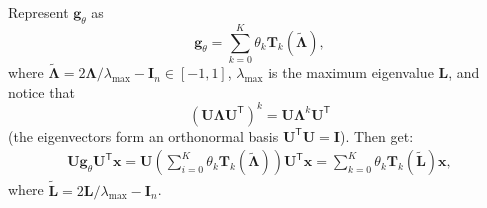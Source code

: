 \documentclass[12pt,twosides]{extarticle}
\begin{document}
Represent $\mathbf{g}_{\theta}$ as
\[\mathbf{g}_{\theta}=\sum_{k=0}^{K} \theta_{k} \mathbf{T}_{k}\mathbf{(\tilde{\Lambda})},	\]
where $\mathbf{\tilde{\Lambda}} = 2 \mathbf{\Lambda} / \lambda_{\max }-\mathbf{I}_{n} \in[-1,1]$, $\lambda_{\max }$ is the maximum eigenvalue $\mathbf{L}$, and notice that
\[
\left(\mathbf{U} \mathbf{\Lambda} \mathbf{U}^{\mathsf{T}}\right)^{k}=\mathbf{U} \mathbf{\Lambda}^{k} \mathbf{U}^{\mathsf{T}}
\]
(the eigenvectors form an orthonormal basis $\mathbf{U}^{\mathsf{T}}\mathbf{U}=\mathbf{I}$). Then get:
\begin{align}
\mathbf{U g}_{\theta} \mathbf{U}^{\mathsf{T}} \mathbf{x}=\mathbf{U}\left(\sum_{i=0}^{K} \theta_{k} \mathbf{T}_{k}(\tilde{\mathbf{\Lambda}})\right) \mathbf{U}^{\mathsf{T}} \mathbf{x} = \sum_{k=0}^{K} \theta_{k} \mathbf{T}_{k}(\tilde{\mathbf{L}}) \mathbf{x},
\label{cheb_appr}
\end{align}
where $\tilde{\mathbf{L}}=2 \mathbf{L} / \lambda_{\max }-\mathbf{I}_{n}$.
\end{document}
